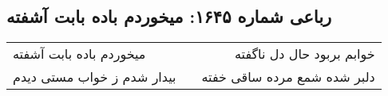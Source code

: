\begin{center}
\section*{رباعی شماره ۱۶۴۵: میخوردم باده بابت آشفته}
\label{sec:1645}
\begin{longtable}{l p{0.5cm} r}
میخوردم باده بابت آشفته
&&
خوابم بربود حال دل ناگفته
\\
بیدار شدم ز خواب مستی دیدم
&&
دلبر شده شمع مرده ساقی خفته
\\
\end{longtable}
\end{center}
